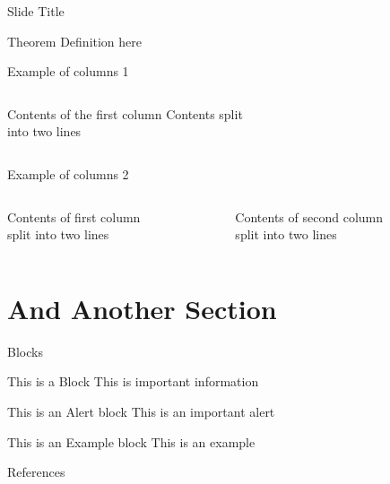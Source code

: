 \begin{frame}{Slide Title}
\begin{exampleblock}
{Theorem}
Definition here
\end{exampleblock}
\end{frame}

\begin{frame}{Example of columns 1}
 \begin{columns}[c]
  Contents of the first column
  Contents split \\ into two lines
 \end{columns}
\end{frame}
 
\begin{frame}{Example of columns 2}
 \begin{columns}[T]
  \begin{column}[T]{5cm}
   Contents of first column \\ split into two lines
  \end{column}
  \begin{column}[T]{5cm}
   Contents of second column \\ split into two lines
  \end{column}
 \end{columns}
\end{frame}

\section{And Another Section}

\begin{frame}{Blocks}
 \begin{block}{This is a Block}
   This is important information
 \end{block}

 \begin{alertblock}{This is an Alert block}
   This is an important alert
 \end{alertblock}
  
 \begin{exampleblock}{This is an Example block}
  This is an example 
 \end{exampleblock}
\end{frame}

\begin{frame}{References}




\end{frame}


